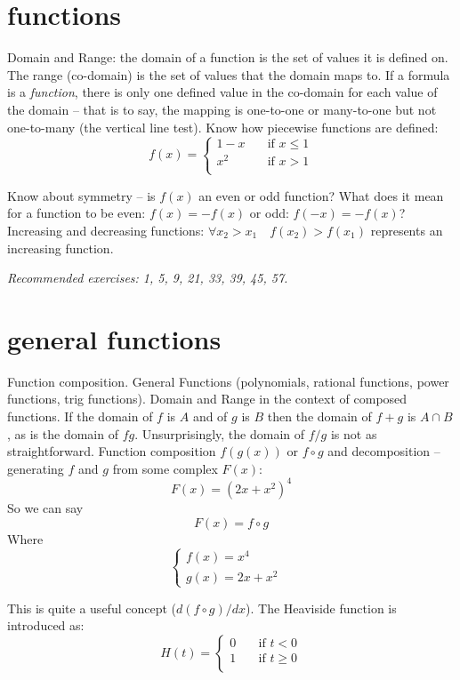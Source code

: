 \documentclass[10pt,a4paper]{report}
\begin{document}
\section{functions}
Domain and Range: the domain of a function is the set of values it is defined on. The range (co-domain) is the set of values that the domain maps to.
If a formula is a \emph{function}, there is only one defined value in the co-domain for each value of the domain -- that is to say, the mapping is one-to-one or many-to-one but not one-to-many (the vertical line test).
Know how piecewise functions are defined:
$$ f(x) =
	\begin{cases}
		1 - x 	& \quad \text{if } x \leq 1 \\
		x^2		& \quad \text{if } x > 1 \\
	\end{cases}
$$

Know about symmetry -- is $f(x)$ an even or odd function?
What does it mean for a function to be even: $f(x) = -f(x)$ or odd: $f(-x) = -f(x)$?
Increasing and decreasing functions: $\forall x_2 > x_1 \quad f(x_2) > f(x_1)$ represents an increasing function.

\emph{Recommended exercises: 1, 5, 9, 21, 33, 39, 45, 57.}

\section{general functions}
Function composition.
General Functions (polynomials, rational functions, power functions, trig functions).
Domain and Range in the context of composed functions.
If the domain of $f$ is $A$ and of $g$ is $B$ then the domain of $f + g$ is $A \cap B$, as is the domain of $fg$. Unsurprisingly, the domain of $f/g$ is not as straightforward.
Function composition $f(g(x))$ or $f \circ g$ and decomposition -- generating $f$ and $g$ from some complex $F(x)$:
$$
F(x) = (2x + x^2)^4 
$$
So we can say
$$
F(x) = f \circ g 
$$
Where
$$
	\begin{cases}
		f(x) = x^4 & \\
		g(x) = 2x + x^2 & 
	\end{cases}
$$

This is quite a useful concept ($d(f \circ g)/dx$).
The Heaviside function is introduced as:
$$
H(t) = 
	\begin{cases}
		0 	& \quad \text{if } t < 0 \\
		1 	& \quad \text{if } t \geq 0 \\
	\end{cases}
$$
\end{document}
